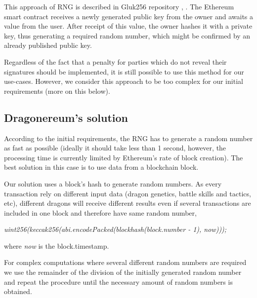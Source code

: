\documentclass[12pt]{article}
\begin{document}
This approach of RNG is described in Gluk256 repository  \cite{Dao_Casino_Ksenya_Serova_2017_Jun_27},  \cite{Gluk256_2016_Aug_26}. The Ethereum smart contract receives a newly generated public key from the owner and awaits a value from the user. After receipt of this value, the owner hashes it with a private key, thus generating a required random number, which might be confirmed by an already published public key.\par

Regardless of the fact that a penalty for parties which do not reveal their signatures should be implemented, it is still possible to use this method for our use-cases. However, we consider this approach to be too complex for our initial requirements (more on this below).\par

\vspace{\baselineskip}
\subsection{Dragonereum’s solution}
\label{Dragonereums solution}  \par

According to the initial requirements, the RNG has to generate a random number as fast as possible (ideally it should take less than 1 second, however, the processing time is currently limited by Ethereum’s rate of block creation). The best solution in this case is to use data from a blockchain block.\par

Our solution uses a block’s hash to generate random numbers. As every transaction rely on different input data (dragon genetics, battle skills and tactics, etc), different dragons will receive different results even if several transactions are included in one block and therefore have same random number,\par

\begin{Center}
\textit{uint256(keccak256(abi.encodePacked(blockhash(block.number - 1), now)));}
\end{Center}\par

where \textit{ now} is the block.timestamp.\par

For complex computations where several different random numbers are required we use the remainder of the division of the initially generated random number and repeat the procedure until the necessary amount of random numbers is obtained.\par
\end{document}
